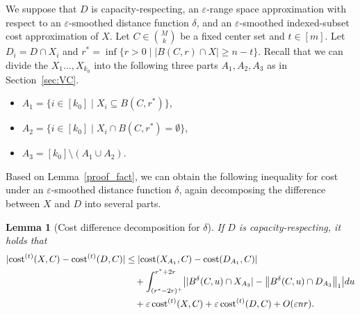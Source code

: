 \documentclass[11pt,letterpaper]{article}
\newtheorem{lemma}[theorem]{Lemma}
\theoremstyle{definition}
\newcommand{\eps}{\varepsilon}
\DeclarePairedDelimiter{\abs}{\lvert}{\rvert}
\DeclarePairedDelimiter{\norm}{\lVert}{\rVert}
\begin{document}
We suppose that $D$ is capacity-respecting, an $\eps$-range space approximation with respect to an $\eps$-smoothed distance function $\delta$, and an $\eps$-smoothed indexed-subset cost approximation of $X$. 
%
Let $C\in \binom{M}{k}$ be a fixed center set and $t\in [m]$. 
%
Let $D_i=D\cap X_i$ and $r^\ast=\inf \{r>0\;\big|\; |B(C,r)\cap X|\geq n-t\}$. 
%
Recall that we can divide the $X_1\dots,X_{k_0}$ into the following three parts $A_1,A_2,A_3$ as in Section~\ref{sec:VC}. 
%
\begin{itemize}[itemsep=0pt]
\item $A_1=\{i\in [k_0]\mid X_i\subseteq B 
(C,r^\ast)\}$,
\item $A_2=\{i\in [k_0]\mid X_i\cap B 
(C,r^\ast)=\emptyset\}$,
\item $A_3=[k_0]\setminus (A_1\cup A_2)$.
\end{itemize}


%
Based on Lemma~\ref{proof_fact}, we can obtain the following inequality for cost under an $\eps$-smoothed distance function $\delta$, again decomposing the difference between $X$ and $D$ into several parts.


\begin{lemma}[Cost difference decomposition for $\delta$]\label{lemma:diffrerence:doubling}
If $D$ is capacity-respecting, it holds that 
\begin{equation} \label{inq:cost:doubling}
	\begin{aligned}
	    \abs{ \cost[t](X,C)-\cost[t](D,C) } &\leq \abs{ \cost(X_{A_1},C)-\cost(D_{A_1},C) } \\
	    &\quad + \int_{(r^\ast-2r)^+}^{r^\ast+2r} \abs*{ |B^\delta(C,u)\cap X_{A_3}|-\norm[\big]{B^\delta(C,u)\cap D_{A_3}}_1 } du \\
	    &\quad +\eps  \cost^{(t)}(X,C) +\eps \cost[t](D,C) + O(\eps n r).
	\end{aligned}
\end{equation}
\end{lemma}
\end{document}
